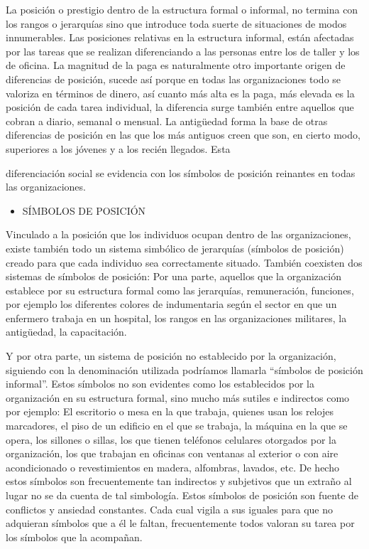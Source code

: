 La posición o prestigio dentro de la estructura formal o informal, no termina con los rangos o jerarquías sino que introduce toda suerte de situaciones de modos innumerables. Las posiciones relativas en la estructura informal, están afectadas por las tareas que se realizan diferenciando a las personas entre los de taller y los de oficina. La magnitud de la paga es naturalmente otro importante origen de diferencias de posición, sucede así porque en todas las organizaciones todo se valoriza en términos de dinero, así cuanto más alta es la paga, más elevada es la posición de cada tarea individual, la diferencia surge también entre aquellos que cobran a diario, semanal o mensual. La antigüedad forma la base de otras diferencias de posición en las que los más antiguos creen que son, en cierto modo, superiores a los jóvenes y a los recién llegados. Esta



diferenciación social se evidencia con los símbolos de posición reinantes en todas las organizaciones.

\begin{itemize}
  \item SÍMBOLOS DE POSICIÓN
\end{itemize}
Vinculado a la posición que los individuos ocupan dentro de las organizaciones, existe también todo un sistema simbólico de jerarquías (símbolos de posición) creado para que cada individuo sea correctamente situado. También coexisten dos sistemas de símbolos de posición: Por una parte, aquellos que la organización establece por su estructura formal como las jerarquías, remuneración, funciones, por ejemplo los diferentes colores de indumentaria según el sector en que un enfermero trabaja en un hospital, los rangos en las organizaciones militares, la antigüedad, la capacitación.

Y por otra parte, un sistema de posición no establecido por la organización, siguiendo con la denominación utilizada podríamos llamarla “símbolos de posición informal”. Estos símbolos no son evidentes como los establecidos por la organización en su estructura formal, sino mucho más sutiles e indirectos como por ejemplo: El escritorio o mesa en la que trabaja, quienes usan los relojes marcadores, el piso de un edificio en el que se trabaja, la máquina en la que se opera, los sillones o sillas, los que tienen teléfonos celulares otorgados por la organización, los que trabajan en oficinas con ventanas al exterior o con aire acondicionado o revestimientos en madera, alfombras, lavados, etc. De hecho estos símbolos son frecuentemente tan indirectos y subjetivos que un extraño al lugar no se da cuenta de tal simbología. Estos símbolos de posición son fuente de conflictos y ansiedad constantes. Cada cual vigila a sus iguales para que no adquieran símbolos que a él le faltan, frecuentemente todos valoran su tarea por los símbolos que la acompañan.

